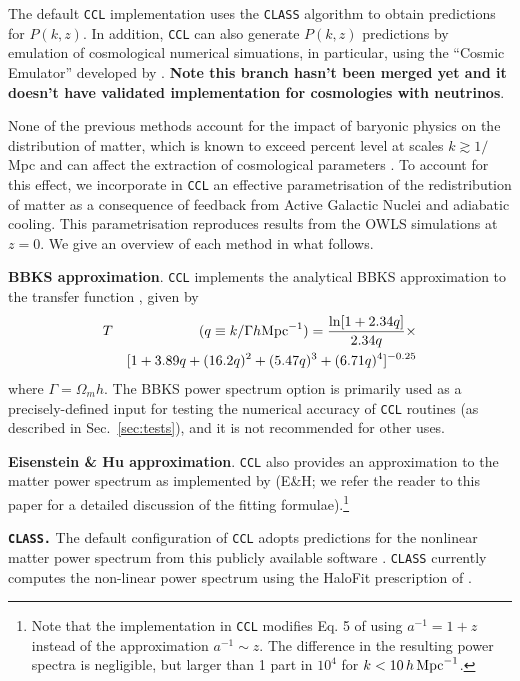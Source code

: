 \documentclass[\docopts]{\docclass}
\newcommand{\ccl}{{\tt CCL}\xspace}
\begin{document}
The default \ccl implementation uses the {\tt CLASS} algorithm \citet{class} to obtain predictions for $P(k,z)$. In addition, \ccl can also generate $P(k,z)$ predictions by emulation of cosmological numerical simuations, in particular, using the ``Cosmic Emulator'' developed by \citet{Lawrence17}. {\bf Note this branch hasn't been merged yet and it doesn't have validated implementation for cosmologies with neutrinos}.

None of the previous methods account for the impact of baryonic physics on the distribution of matter, which is known to exceed percent level at scales $k \gtrsim 1/$Mpc \citep{vanDaalen11,Illustris,Hellwing16,Springel17} and can affect the extraction of cosmological parameters \citep{Semboloni11,Semboloni13,Mohammed14,Eifler15,Mohammed17}. To account for this effect, we incorporate in \ccl an effective parametrisation \citep{Schneider15} of the redistribution of matter as a consequence of feedback from Active Galactic Nuclei and adiabatic cooling. This parametrisation reproduces results from the OWLS simulations at $z=0$. We give an overview of each method in what follows.

{\bf BBKS approximation}. \ccl implements the analytical BBKS approximation to the transfer function \citep{BBKS}, given by
\begin{eqnarray}
  T&&(q\equiv k/\Gamma h {\rm Mpc}^{-1}) = \frac{\ln[1+2.34q]}{2.34q}\times\\
  &&[1+3.89q+(16.2q)^2+(5.47q)^3+(6.71q)^4]^{-0.25}\nonumber
\end{eqnarray}
where $\Gamma = \Omega_m h$. The BBKS power spectrum option is primarily used as a precisely-defined input for testing the numerical accuracy of \ccl routines (as described in Sec.~\ref{sec:tests}), and it is not recommended for other uses.

{\bf Eisenstein \& Hu approximation}. \ccl also provides an approximation to the matter power spectrum as implemented by \citet{1998ApJ...496..605E} (E\&H; we refer the reader to this paper for a detailed discussion of the fitting formulae).\footnote{Note that the implementation in \ccl modifies Eq. 5 of \citet{1998ApJ...496..605E} using $a^{-1}=1+z$ instead of the approximation $a^{-1}\sim z$. The difference in the resulting power spectra is negligible, but larger than 1 part in $10^4$ for $k<10\,h\,{\rm Mpc}^{-1}$.}

{\bf \tt CLASS.} The default configuration of \ccl adopts predictions for the nonlinear matter power spectrum from this publicly available software \citep{class}. {\tt CLASS} currently computes the non-linear power spectrum using the HaloFit prescription of \cite{CLASS_halofit}.
\end{document}
